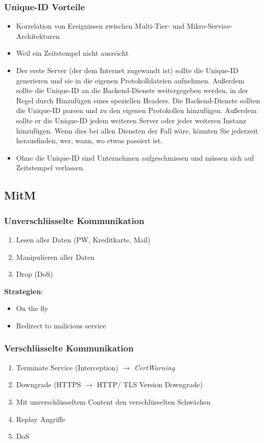 \subsubsection{Unique-ID Vorteile}
\begin{itemize}
    \item Korrelation von Ereignissen zwischen Multi-Tier- und Mikro-Service-Architekturen
    \item Weil ein Zeitstempel nicht ausreicht
    \item Der erste Server (der dem Internet zugewandt ist) sollte die Unique-ID generieren und sie in die eigenen Protokolldateien aufnehmen. Außerdem sollte die Unique-ID an die Backend-Dienste weitergegeben werden, in der Regel durch Hinzufügen eines speziellen Headers. Die Backend-Dienste sollten die Unique-ID parsen und zu den eigenen Protokollen hinzufügen. Außerdem sollte er die Unique-ID jedem weiteren Server oder jeder weiteren Instanz hinzufügen. Wenn dies bei allen Diensten der Fall wäre, könnten Sie jederzeit herausfinden, wer, wann, wo etwas passiert ist.
    \item Ohne die Unique-ID sind Unternehmen aufgeschmissen und müssen sich auf Zeitstempel verlassen.
\end{itemize}

\newpage

\subsection{MitM}

\subsubsection{Unverschlüsselte Kommunikation}
\begin{enumerate}
    \item Lesen aller Daten (PW, Kreditkarte, Mail)
    \item Manipulieren aller Daten
    \item Drop (DoS)\\
\end{enumerate}

\textbf{Strategien}:
\begin{itemize}
    \item On the fly
    \item Redirect to malicious service
\end{itemize}

\subsubsection{Verschlüsselte Kommunikation}
\begin{enumerate}
    \item Terminate Service (Interception) $\rightarrow$ \textit{CertWarning}
    \item Downgrade (HTTPS $\rightarrow$ HTTP/ TLS Version Downgrade)
    \item Mit unverschlüsseltem Content den verschlüsselten Schwächen
    \item Replay Angriffe
    \item DoS
\end{enumerate}

